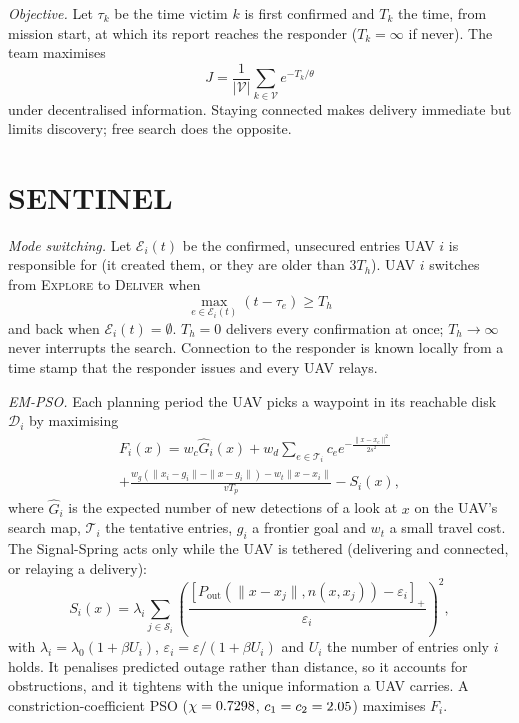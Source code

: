 \documentclass[conference]{IEEEtran}
\begin{document}
\emph{Objective.} Let $\tau_k$ be the time victim $k$ is first confirmed and $T_k$ the time, from
mission start, at which its report reaches the responder ($T_k=\infty$ if never). The team maximises
\begin{equation}
J=\frac{1}{|\mathcal{V}|}\sum_{k\in\mathcal{V}}e^{-T_k/\theta}\label{eq:J}
\end{equation}
under decentralised information. Staying connected makes delivery immediate but limits discovery;
free search does the opposite.

\section{SENTINEL}\label{sec:method}
\emph{Mode switching.} Let $\mathcal{E}_i(t)$ be the confirmed, unsecured entries UAV $i$ is
responsible for (it created them, or they are older than $3T_h$). UAV $i$ switches from
\textsc{Explore} to \textsc{Deliver} when
\begin{equation}
\max_{e\in\mathcal{E}_i(t)}(t-\tau_e)\ge T_h\label{eq:trigger}
\end{equation}
and back when $\mathcal{E}_i(t)=\emptyset$. $T_h=0$ delivers every confirmation at once;
$T_h\to\infty$ never interrupts the search. Connection to the responder is known locally from a
time stamp that the responder issues and every UAV relays.

\emph{EM-PSO.} Each planning period the UAV picks a waypoint in its reachable disk $\mathcal{D}_i$ by
maximising
\begin{multline}
F_i(x)=w_c\hat G_i(x)+w_d\!\!\sum_{e\in\mathcal{T}_i}\!c_e e^{-\frac{\|x-x_e\|^2}{2s^2}}\\
+\frac{w_g(\|x_i-g_i\|-\|x-g_i\|)-w_t\|x-x_i\|}{vT_p}-S_i(x),\label{eq:fitness}
\end{multline}
where $\hat G_i$ is the expected number of new detections of a look at $x$ on the UAV's search map,
$\mathcal{T}_i$ the tentative entries, $g_i$ a frontier goal and $w_t$ a small travel cost. The
Signal-Spring acts only while the UAV is tethered (delivering and connected, or relaying a delivery):
\begin{equation}
S_i(x)=\lambda_i\!\sum_{j\in\mathcal{S}_i}\!\left(\frac{[P_{\mathrm{out}}(\|x-x_j\|,n(x,x_j))-\varepsilon_i]_+}{\varepsilon_i}\right)^{\!2},\label{eq:spring}
\end{equation}
with $\lambda_i=\lambda_0(1+\beta U_i)$, $\varepsilon_i=\varepsilon/(1+\beta U_i)$ and $U_i$ the
number of entries only $i$ holds. It penalises predicted outage rather than distance, so it accounts
for obstructions, and it tightens with the unique information a UAV carries. A
constriction-coefficient PSO ($\chi=0.7298$, $c_1=c_2=2.05$) \cite{clerc2002} maximises $F_i$.
\end{document}
